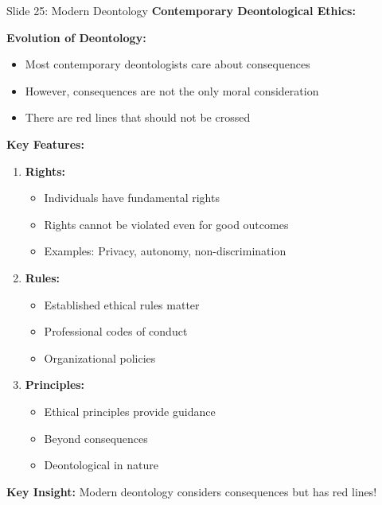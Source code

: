 \documentclass[8pt]{beamer}
\begin{document}
	\begin{frame}{Slide 25: Modern Deontology}
		\fontsize{6.5}{7.5}\selectfont
		\textbf{Contemporary Deontological Ethics:}
		
		\vspace{0.1cm}
		\textbf{Evolution of Deontology:}
		\begin{itemize}
			\item Most contemporary deontologists care about consequences
			\item However, consequences are not the only moral consideration
			\item There are red lines that should not be crossed
		\end{itemize}
		
		\vspace{0.1cm}
		\textbf{Key Features:}
		\begin{enumerate}
			\item \textbf{Rights:}
			\begin{itemize}
				\item Individuals have fundamental rights
				\item Rights cannot be violated even for good outcomes
				\item Examples: Privacy, autonomy, non-discrimination
			\end{itemize}
			\item \textbf{Rules:}
			\begin{itemize}
				\item Established ethical rules matter
				\item Professional codes of conduct
				\item Organizational policies
			\end{itemize}
			\item \textbf{Principles:}
			\begin{itemize}
				\item Ethical principles provide guidance
				\item Beyond consequences
				\item Deontological in nature
			\end{itemize}
		\end{enumerate}
		
		\textcolor{myblue}{\textbf{Key Insight:}} Modern deontology \textcolor{myblue}{considers consequences but has red lines}!
	\end{frame}
	
\end{document}
